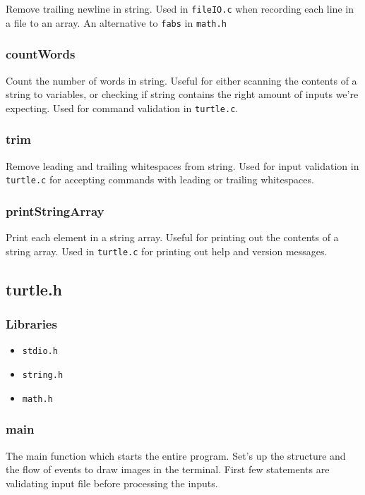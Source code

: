 \documentclass[a4paper, 12pt, titlepage]{article}
\newcommand{\code}[1]{\small\texttt{#1}\normalsize}
\begin{document}
Remove trailing newline in string. Used in \code{fileIO.c} when recording
each line in a file to an array. An alternative to \code{fabs} in
\code{math.h}

\subsubsection{countWords}

Count the number of words in string. Useful for either scanning the contents
of a string to variables, or checking if string contains the right amount of
inputs we're expecting. Used for command validation in \code{turtle.c}.

\subsubsection{trim}

Remove leading and trailing whitespaces from string. Used for input
validation in \code{turtle.c} for accepting commands with leading or trailing
whitespaces.

\subsubsection{printStringArray}

Print each element in a string array. Useful for printing out the contents
of a string array. Used in \code{turtle.c} for printing out help and version
messages.

\pagebreak
\subsection{turtle.h}
\subsubsection{Libraries}

\begin{itemize}[label={--}, noitemsep]
    \item \code{stdio.h}
    \item \code{string.h}
    \item \code{math.h}
\end{itemize}

\subsubsection{main}

The main function which starts the entire program. Set's up the structure
and the flow of events to draw images in the terminal. First few statements
are validating input file before processing the inputs.
\end{document}
